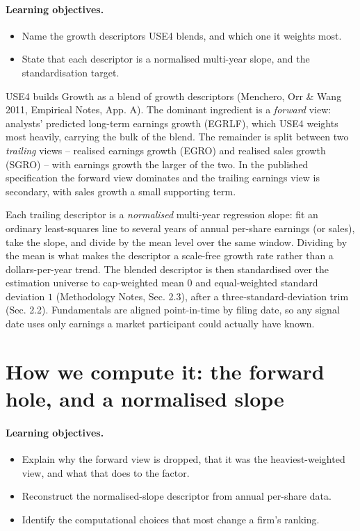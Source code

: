 \documentclass[11pt]{article}
\theoremstyle{definition}
\theoremstyle{plain}
\theoremstyle{remark}
\begin{document}
\paragraph{Learning objectives.}
\begin{itemize}[leftmargin=1.4em,topsep=2pt]
  \item Name the growth descriptors USE4 blends, and which one it weights most.
  \item State that each descriptor is a normalised multi-year slope, and the standardisation target.
\end{itemize}

USE4 builds Growth as a blend of growth descriptors (Menchero, Orr \& Wang 2011, Empirical Notes, App. A). The dominant ingredient is a \emph{forward} view: analysts' predicted long-term earnings growth (EGRLF), which USE4 weights most heavily, carrying the bulk of the blend. The remainder is split between two \emph{trailing} views -- realised earnings growth (EGRO) and realised sales growth (SGRO) -- with earnings growth the larger of the two. In the published specification the forward view dominates and the trailing earnings view is secondary, with sales growth a small supporting term.

Each trailing descriptor is a \emph{normalised} multi-year regression slope: fit an ordinary least-squares line to several years of annual per-share earnings (or sales), take the slope, and divide by the mean level over the same window. Dividing by the mean is what makes the descriptor a scale-free growth rate rather than a dollars-per-year trend. The blended descriptor is then standardised over the estimation universe to cap-weighted mean $0$ and equal-weighted standard deviation $1$ (Methodology Notes, Sec. 2.3), after a three-standard-deviation trim (Sec. 2.2). Fundamentals are aligned point-in-time by filing date, so any signal date uses only earnings a market participant could actually have known.

\section{How we compute it: the forward hole, and a normalised slope}\label{sec:compute}

\paragraph{Learning objectives.}
\begin{itemize}[leftmargin=1.4em,topsep=2pt]
  \item Explain why the forward view is dropped, that it was the heaviest-weighted view, and what that does to the factor.
  \item Reconstruct the normalised-slope descriptor from annual per-share data.
  \item Identify the computational choices that most change a firm's ranking.
\end{itemize}
\end{document}
